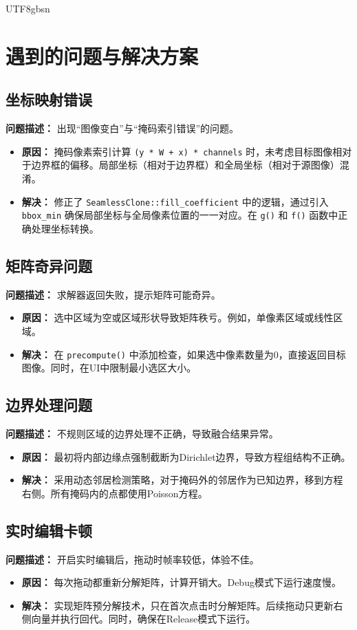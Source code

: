 \documentclass[11pt,a4paper]{article}
\begin{document}
\begin{CJK*}{UTF8}{gbsn}
\section{遇到的问题与解决方案}

\subsection{坐标映射错误}
\textbf{问题描述：} 出现“图像变白”与“掩码索引错误”的问题。
\begin{itemize}
    \item \textbf{原因：} 掩码像素索引计算 \texttt{(y * W + x) * channels} 时，未考虑目标图像相对于边界框的偏移。局部坐标（相对于边界框）和全局坐标（相对于源图像）混淆。
    \item \textbf{解决：} 修正了 \texttt{SeamlessClone::fill\_coefficient} 中的逻辑，通过引入 \texttt{bbox\_min} 确保局部坐标与全局像素位置的一一对应。在 \texttt{g()} 和 \texttt{f()} 函数中正确处理坐标转换。
\end{itemize}

\subsection{矩阵奇异问题}
\textbf{问题描述：} 求解器返回失败，提示矩阵可能奇异。
\begin{itemize}
    \item \textbf{原因：} 选中区域为空或区域形状导致矩阵秩亏。例如，单像素区域或线性区域。
    \item \textbf{解决：} 在 \texttt{precompute()} 中添加检查，如果选中像素数量为0，直接返回目标图像。同时，在UI中限制最小选区大小。
\end{itemize}

\subsection{边界处理问题}
\textbf{问题描述：} 不规则区域的边界处理不正确，导致融合结果异常。
\begin{itemize}
    \item \textbf{原因：} 最初将内部边缘点强制截断为Dirichlet边界，导致方程组结构不正确。
    \item \textbf{解决：} 采用动态邻居检测策略，对于掩码外的邻居作为已知边界，移到方程右侧。所有掩码内的点都使用Poisson方程。
\end{itemize}

\subsection{实时编辑卡顿}
\textbf{问题描述：} 开启实时编辑后，拖动时帧率较低，体验不佳。
\begin{itemize}
    \item \textbf{原因：} 每次拖动都重新分解矩阵，计算开销大。Debug模式下运行速度慢。
    \item \textbf{解决：} 实现矩阵预分解技术，只在首次点击时分解矩阵。后续拖动只更新右侧向量并执行回代。同时，确保在Release模式下运行。
\end{itemize}


\end{CJK*}
\end{document}
